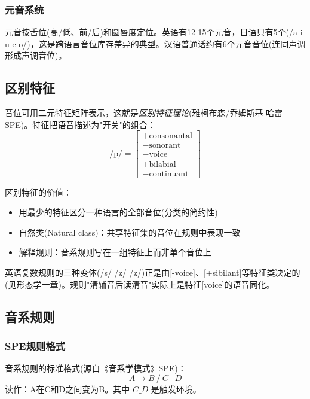 \subsubsection{元音系统}

元音按舌位(高/低、前/后)和圆唇度定位。英语有12-15个元音，日语只有5个(/a i u e o/)，这是跨语言音位库存差异的典型。汉语普通话约有6个元音音位(连同声调形成声调音位)。

\subsection{区别特征}

音位可用二元特征矩阵表示，这就是\emph{区别特征理论}(雅柯布森/乔姆斯基-哈雷SPE)。特征把语音描述为"开关"的组合：
\begin{equation}
    \text{/p/} = 
    \begin{bmatrix}
    +\text{consonantal} \\
    -\text{sonorant} \\
    -\text{voice} \\
    +\text{bilabial} \\
    -\text{continuant}
    \end{bmatrix}
\end{equation}

区别特征的价值：
\begin{itemize}
    \item 用最少的特征区分一种语言的全部音位(分类的简约性)
    \item 自然类(Natural class)：共享特征集的音位在规则中表现一致
    \item 解释规则：音系规则写在一组特征上而非单个音位上
\end{itemize}

\begin{example}
英语复数规则的三种变体(/s/ /z/ /z/)正是由[-voice]、[+sibilant]等特征类决定的(见形态学一章)。规则"清辅音后读清音"实际上是特征[voice]的语音同化。
\end{example}

\subsection{音系规则}

\subsubsection{SPE规则格式}

音系规则的标准格式(源自《音系学模式》SPE)：
\begin{equation}
    A \rightarrow B \ / \ C \ \_ \ D
\end{equation}
读作：A在C和D之间变为B。其中 $C \_ D$ 是触发环境。

